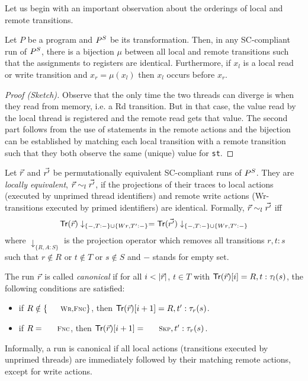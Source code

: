 \documentclass[preprint,9pt]{sigplanconf}
\begin{document}
Let us begin with an important observation about the orderings of local and remote transitions.
\begin{lemma}\label{lem:transformation-bijection}
Let $P$ be a program and $P^S$ be its transformation.
Then, in any SC-compliant run of $P^S$, there is a bijection $\mu$ between all local and remote transitions such that the assignments to registers are identical.
Furthermore, if $x_l$ is a local read or write transition and $x_r=\mu(x_l)$ then $x_l$ occurs before $x_r$.
\end{lemma}
\begin{proof}[Proof (Sketch)]
Observe that the only time the two threads can diverge is when they read from memory, i.e. a {\sc\small Rd} transition.
But in that case, the value read by the local thread is registered and the remote read gets that value.
The second part follows from the use of {\aliassume} statements in the remote actions and the bijection can be established by matching each local transition with a remote transition such that they both observe the same (unique) value for {\tt st}.
\end{proof}

Let $\vec{r}$ and $\vec{r'}$ be permutationally equivalent SC-compliant runs of $P^S$.
They are {\em locally equivalent}, $\vec{r}\sim_l \vec{r'}$, if the projections of their traces to local actions (executed by unprimed thread identifiers) and remote write actions ({\sc\small Wr}-transitions executed by primed identifiers) are identical.
Formally, $\vec{r}\sim_l \vec{r'}$ iff 
\[
\alitracex {\alisequencex r}\downarrow_{\{-,T:-\}\cup\{{\sc\small Wr},T':-\}} = \alitracex {\alisequencex {r'}}\downarrow_{\{-,T:-\}\cup\{{\sc\small Wr},T':-\}}
\]
where $\downarrow_{\{R,A:S\}}$ is the projection operator which removes all transitions $r,t:s$ such that $r\notin R$ or $t\notin T$ or $s\notin S$ and $-$ stands for empty set.

The run $\vec{r}$ is called {\em canonical} if for all $i<|\alisequencex {r}|$, $t\in T$ with $\mathsf{Tr}(\vec{r})[i]=R,t:\tau_{l}(s)$, the following conditions are satisfied:
\begin{itemize}
\item if $R\notin \{\textnormal{\sc\small Wr,Fnc}\}$, then $\mathsf{Tr}(\vec{r})[i+1]=R,t':\tau_{r}(s)$.
\item if $R=\textnormal{\sc\small Fnc}$, then $\alitracex {\alisequencex {r}}[i+1]=\textnormal{\sc\small Skp},t':\aliremtransx s$.
\end{itemize}
Informally, a run is canonical if all local actions (transitions executed by unprimed threads) are immediately followed by their matching remote actions, except for write actions.
\end{document}
